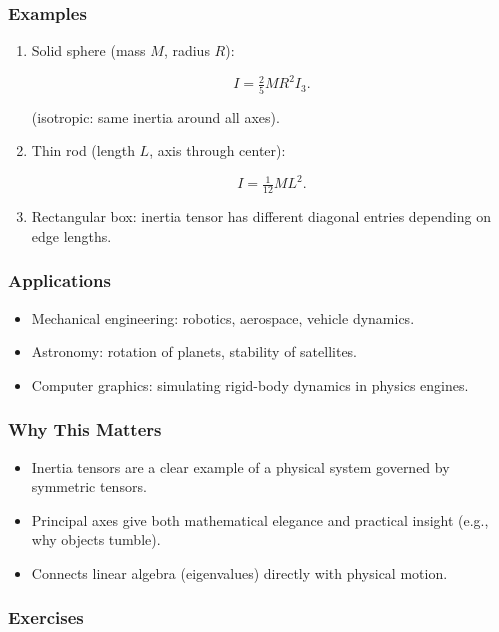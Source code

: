 \documentclass[
  letterpaper,
  DIV=11,
  numbers=noendperiod]{scrreprt}
\providecommand{\tightlist}{%
  \setlength{\itemsep}{0pt}\setlength{\parskip}{0pt}}
\begin{document}
\subsubsection{Examples}\label{examples-1}

\begin{enumerate}
\def\labelenumi{\arabic{enumi}.}
\item
  Solid sphere (mass \(M\), radius \(R\)):

  \[
  I = \tfrac{2}{5} M R^2 I_3.
  \]

  (isotropic: same inertia around all axes).
\item
  Thin rod (length \(L\), axis through center):

  \[
  I = \tfrac{1}{12} M L^2.
  \]
\item
  Rectangular box: inertia tensor has different diagonal entries
  depending on edge lengths.
\end{enumerate}

\subsubsection{Applications}\label{applications-9}

\begin{itemize}
\tightlist
\item
  Mechanical engineering: robotics, aerospace, vehicle dynamics.
\item
  Astronomy: rotation of planets, stability of satellites.
\item
  Computer graphics: simulating rigid-body dynamics in physics engines.
\end{itemize}

\subsubsection{Why This Matters}\label{why-this-matters-52}

\begin{itemize}
\tightlist
\item
  Inertia tensors are a clear example of a physical system governed by
  symmetric tensors.
\item
  Principal axes give both mathematical elegance and practical insight
  (e.g., why objects tumble).
\item
  Connects linear algebra (eigenvalues) directly with physical motion.
\end{itemize}

\subsubsection{Exercises}\label{exercises-66}
\end{document}
